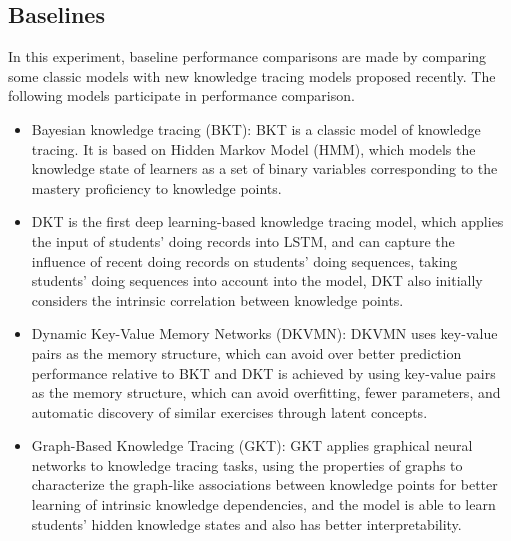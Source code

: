 \subsection{Baselines}
In this experiment, baseline performance comparisons are made by comparing some classic models with new knowledge tracing models proposed recently. The following models participate in performance comparison.
\begin{itemize}
	\item Bayesian knowledge tracing (BKT)\cite{yudelson2013individualized}: BKT is a classic model of knowledge tracing. It is based on Hidden Markov Model (HMM), which models the knowledge state of learners as a set of binary variables corresponding to the mastery proficiency to knowledge points.
	\item DKT is the first deep learning-based knowledge tracing model, which applies the input of students' doing records into LSTM, and can capture the influence of recent doing records on students' doing sequences, taking students' doing sequences into account into the model, DKT also initially considers the intrinsic correlation between knowledge points.
	\item Dynamic Key-Value Memory Networks (DKVMN)\cite{zhang2017dynamic}: DKVMN uses key-value pairs as the memory structure, which can avoid over better prediction performance relative to BKT and DKT is achieved by using key-value pairs as the memory structure, which can avoid overfitting, fewer parameters, and automatic discovery of similar exercises through latent concepts.
	\item Graph-Based Knowledge Tracing (GKT)\cite{nakagawa2019graph}: GKT applies graphical neural networks to knowledge tracing tasks, using the properties of graphs to characterize the graph-like associations between knowledge points for better learning of intrinsic knowledge dependencies, and the model is able to learn students' hidden knowledge states and also has better interpretability.
\end{itemize}

